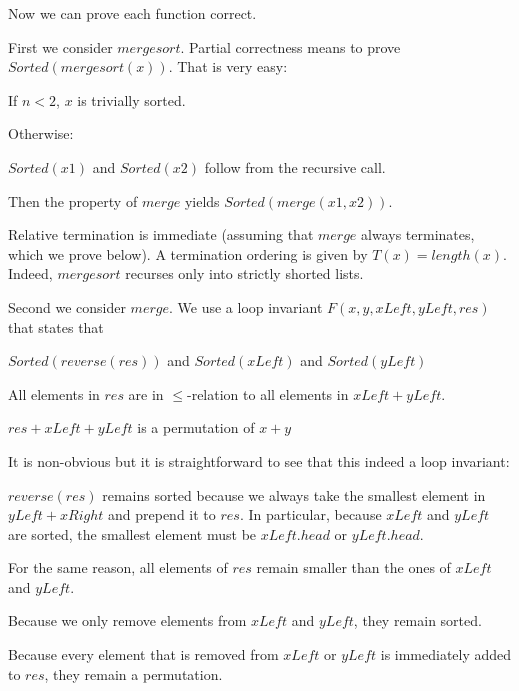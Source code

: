 Now we can prove each function correct.
\medskip

First we consider $mergesort$.
Partial correctness means to prove $Sorted(mergesort(x))$.
That is very easy:
\begin{compactitem}
  \item If $n<2$, $x$ is trivially sorted.
  \item Otherwise:
   \begin{compactitem}
     \item $Sorted(x1)$ and $Sorted(x2)$ follow from the recursive call.
     \item Then the property of $merge$ yields $Sorted(merge(x1,x2))$.
   \end{compactitem}
\end{compactitem}

Relative termination is immediate (assuming that $merge$ always terminates, which we prove below).
A termination ordering is given by $T(x)=length(x)$.
Indeed, $mergesort$ recurses only into strictly shorted lists.
\medskip

Second we consider $merge$.
We use a loop invariant $F(x,y,xLeft,yLeft,res)$ that states that
 \begin{compactitem}
  \item $Sorted(reverse(res))$ and $Sorted(xLeft)$ and $Sorted(yLeft)$
  \item All elements in $res$ are in $\leq$-relation to all elements in $xLeft+yLeft$.
  \item $res+xLeft+yLeft$ is a permutation of $x+y$
 \end{compactitem}
It is non-obvious but it is straightforward to see that this indeed a loop invariant:
 \begin{compactitem}
   \item $reverse(res)$ remains sorted because we always take the smallest element in $yLeft+xRight$ and prepend it to $res$.
    In particular, because $xLeft$ and $yLeft$ are sorted, the smallest element must be $xLeft.head$ or $yLeft.head$.
   \item For the same reason, all elements of $res$ remain smaller than the ones of $xLeft$ and $yLeft$.
   \item Because we only remove elements from $xLeft$ and $yLeft$, they remain sorted.
   \item Because every element that is removed from $xLeft$ or $yLeft$ is immediately added to $res$, they remain a permutation.
 \end{compactitem}

